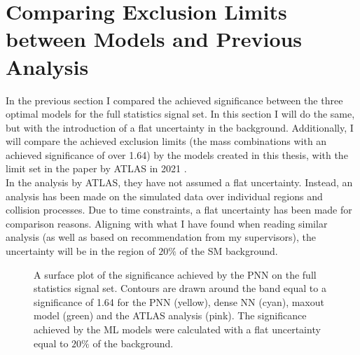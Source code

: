 \section{Comparing Exclusion Limits between Models and Previous Analysis}
In the previous section I compared the achieved significance between 
the three optimal models for the full statistics signal set. In this section 
I will do the same, but with the introduction of a flat uncertainty in the background.
Additionally, I will compare the achieved exclusion limits (the mass combinations with an achieved 
significance of over 1.64) by the models created in this thesis, with the limit set in the paper by ATLAS 
in 2021 \cite{atlas_search_2021}.
\\
In the analysis by ATLAS, they have not assumed a flat uncertainty. Instead, an analysis has been made on the simulated data 
over individual regions and collision processes. Due to time constraints, a flat uncertainty has been made for comparison 
reasons. Aligning with what I have found when reading similar analysis (as well as based on recommendation from my supervisors), 
the uncertainty will be in the region of $20\%$ of the \ac{SM} background.\\
\begin{figure}
    \caption[A surface plot of the significance comparing sensitivity limits set by \ac{PNN}, dense \ac{NN}, maxout model
    and the ATLAS analysis, where the models have assumed a flat uncertainty of $20\%$.]{A surface plot of the significance achieved 
    by the \ac{PNN} on the full statistics signal set. Contours are drawn around the band equal to a significance of 1.64 for the \ac{PNN} 
    (yellow), dense \ac{NN} (cyan), maxout model (green) and the ATLAS analysis (pink). The significance achieved by the \ac{ML} models were 
    calculated with a flat uncertainty equal to $20\%$ of the background.}
    \label{fig:compLimit20}
\end{figure}
